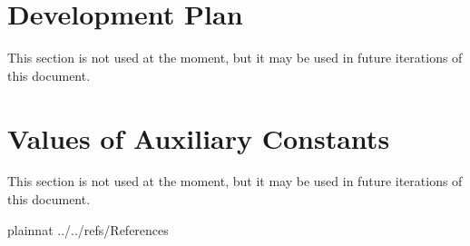 \documentclass[12pt]{article}
\begin{document}
\section{Development Plan}

This section is not used at the moment, but it may be used in future iterations of this document.

\section{Values of Auxiliary Constants}

This section is not used at the moment, but it may be used in future iterations of this document.

\newpage

 {plainnat}
 {../../refs/References}

\newpage
\end{document}
